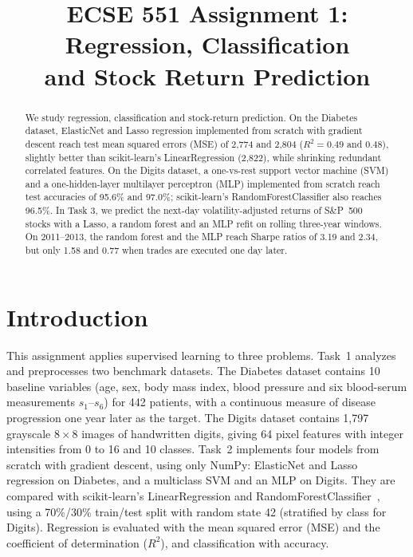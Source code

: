 \documentclass[conference]{IEEEtran}
\begin{document}
\title{ECSE 551 Assignment 1: Regression, Classification\\ and Stock Return Prediction}

\author{
}

\maketitle


\begin{abstract}
We study regression, classification and stock-return prediction. On the Diabetes dataset, ElasticNet and Lasso regression implemented from scratch with gradient descent reach test mean squared errors (MSE) of 2,774 and 2,804 ($R^2 = 0.49$ and $0.48$), slightly better than scikit-learn's LinearRegression (2,822), while shrinking redundant correlated features. On the Digits dataset, a one-vs-rest support vector machine (SVM) and a one-hidden-layer multilayer perceptron (MLP) implemented from scratch reach test accuracies of 95.6\% and 97.0\%; scikit-learn's RandomForestClassifier also reaches 96.5\%.
In Task 3, we predict the next-day volatility-adjusted returns of S\&P~500 stocks with a Lasso, a random forest and an MLP refit on rolling three-year windows. On 2011--2013, the random forest and the MLP reach Sharpe ratios of 3.19 and 2.34, but only 1.58 and 0.77 when trades are executed one day later.
\end{abstract}


\section{Introduction}
This assignment applies supervised learning to three problems. Task~1 analyzes and preprocesses two benchmark datasets. The Diabetes dataset contains 10 baseline variables (age, sex, body mass index, blood pressure and six blood-serum measurements $s_1$--$s_6$) for 442 patients, with a continuous measure of disease progression one year later as the target. The Digits dataset contains 1,797 grayscale $8\times8$ images of handwritten digits, giving 64 pixel features with integer intensities from 0 to 16 and 10 classes. Task~2 implements four models from scratch with gradient descent, using only NumPy: ElasticNet and Lasso regression on Diabetes, and a multiclass SVM and an MLP on Digits. They are compared with scikit-learn's LinearRegression and RandomForestClassifier~\cite{sklearn}, using a 70\%/30\% train/test split with random state 42 (stratified by class for Digits). Regression is evaluated with the mean squared error (MSE) and the coefficient of determination ($R^2$), and classification with accuracy.
\end{document}
